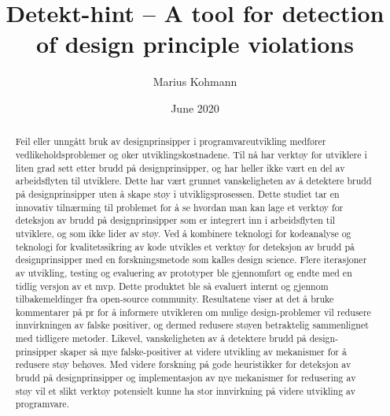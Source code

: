 \documentclass{report}
\title{Detekt-hint -- A tool for detection of design principle violations}
\author{Marius Kohmann}
\date{June 2020}
\begin{document}
\maketitle


\begin{abstract}
    Feil eller unngått bruk av designprinsipper i programvareutvikling medfører vedlikeholdsproblemer og øker utviklingskostnadene. Til nå har verktøy for utviklere i liten grad sett etter brudd på designprinsipper, og har heller ikke vært en del av arbeidsflyten til utviklere. Dette har vært grunnet vanskeligheten av å detektere brudd på designprinsipper uten å skape støy i utvikligsprosessen. Dette studiet tar en innovativ tilnærming til problemet for å se hvordan man kan lage et verktøy for deteksjon av brudd på designprinsipper som er integrert inn i arbeidsflyten til utviklere, og som ikke lider av støy. Ved å kombinere teknologi for kodeanalyse og teknologi for kvalitetssikring av kode utvikles et verktøy for deteksjon av brudd på designprinsipper med en forskningsmetode som kalles design science. Flere iterasjoner av utvikling, testing og evaluering av prototyper ble gjennomført og endte med en tidlig versjon av et \gls{mvp}. Dette produktet ble så evaluert internt og gjennom tilbakemeldinger fra open-source community. Resultatene viser at det å bruke kommentarer på \acrfull{pr} for å informere utvikleren om mulige design-problemer 
    vil redusere innvirkningen av falske positiver, og dermed redusere støyen betraktelig sammenlignet med tidligere metoder. Likevel, vanskeligheten av å detektere brudd på design-prinsipper skaper så mye falske-positiver at videre utvikling av mekanismer for å redusere støy behøves. Med videre forskning på gode heuristikker for deteksjon av brudd på designprinsipper og implementasjon av nye mekanismer for redusering av støy vil et slikt verktøy potensielt kunne ha stor innvirkning på videre utvikling av programvare.  
    
\end{abstract}
\end{document}
